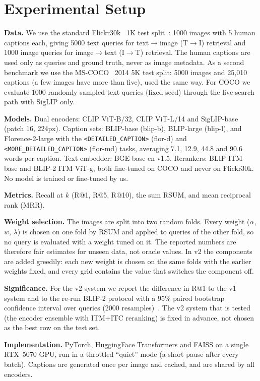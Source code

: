 \documentclass[conference]{IEEEtran}
\newcommand{\RA}{\ensuremath{\rightarrow}}
\begin{document}
\section{Experimental Setup}
\textbf{Data.} We use the standard Flickr30k~\cite{young2014flickr} 1K test split~\cite{karpathy2015deep}:
1000 images with 5 human captions each, giving 5000 text queries for text\RA image (T\RA I) retrieval
and 1000 image queries for image\RA text (I\RA T) retrieval. The human captions are used only as queries
and ground truth, never as image metadata. As a second benchmark we use the MS-COCO~\cite{lin2014coco} 2014
5K test split: 5000 images and 25{,}010 captions (a few images have more than five), used the same way. For
COCO we evaluate 1000 randomly sampled text queries (fixed seed) through the live search path with SigLIP only.

\textbf{Models.} Dual encoders: CLIP ViT-B/32, CLIP ViT-L/14 and SigLIP-base (patch 16, 224px). Caption
sets: BLIP-base (blip-b), BLIP-large (blip-l), and Florence-2-large with the
\texttt{<DETAILED\_CAPTION>} (flor-d) and \texttt{<MORE\_DETAILED\_CAPTION>} (flor-md) tasks, averaging
7.1, 12.9, 44.8 and 90.6 words per caption. Text embedder: BGE-base-en-v1.5. Rerankers:
BLIP ITM base and BLIP-2 ITM ViT-g, both fine-tuned on COCO and never on Flickr30k. No model is trained
or fine-tuned by us.

\textbf{Metrics.} Recall at $k$ (R@1, R@5, R@10), the sum RSUM, and mean reciprocal rank (MRR).

\textbf{Weight selection.} The images are split into two random folds. Every weight ($\alpha$, $w$,
$\lambda$) is chosen on one fold by RSUM and applied to queries of the other fold, so no query is
evaluated with a weight tuned on it. The reported numbers are therefore fair estimates for unseen data,
not oracle values. In v2 the components are added greedily: each new weight is chosen on the same folds with the
earlier weights fixed, and every grid contains the value that switches the component off.

\textbf{Significance.} For the v2 system we report the difference in R@1 to the v1 system and to the re-run
BLIP-2 protocol with a 95\% paired bootstrap confidence interval over queries (2000
resamples)~\cite{efron1993bootstrap}. The v2 system that is tested (the encoder ensemble with ITM+ITC reranking) is
fixed in advance, not chosen as the best row on the test set.

\textbf{Implementation.} PyTorch, HuggingFace Transformers and FAISS on a single RTX~5070 GPU, run in a
throttled ``quiet'' mode (a short pause after every batch). Captions are generated once per image and
cached, and are shared by all encoders.
\end{document}
